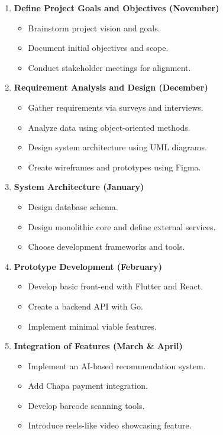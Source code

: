 \documentclass[12pt]{report}
\begin{document}
\begin{enumerate}
	\item \textbf{Define Project Goals and Objectives (November)}
	      \begin{itemize}
		      \item Brainstorm project vision and goals.
		      \item Document initial objectives and scope.
		      \item Conduct stakeholder meetings for alignment.
	      \end{itemize}
	\item \textbf{Requirement Analysis and Design (December)}
	      \begin{itemize}
		      \item Gather requirements via surveys and interviews.
		      \item Analyze data using object-oriented methods.
		      \item Design system architecture using UML diagrams.
		      \item Create wireframes and prototypes using Figma.
	      \end{itemize}
	\item \textbf{System Architecture (January)}
	      \begin{itemize}
		      \item Design database schema.
		      \item Design monolithic core and define external services.
		      \item Choose development frameworks and tools.
	      \end{itemize}
	\item \textbf{Prototype Development (February)}
	      \begin{itemize}
		      \item Develop basic front-end with Flutter and React.
		      \item Create a backend API with Go.
		      \item Implement minimal viable features.
	      \end{itemize}
	\item \textbf{Integration of Features (March \& April)}
	      \begin{itemize}
		      \item Implement an AI-based recommendation system.
		      \item Add Chapa payment integration.
		      \item Develop barcode scanning tools.
		      \item Introduce reels-like video showcasing feature.

\end{itemize}
\end{enumerate}
\end{document}

